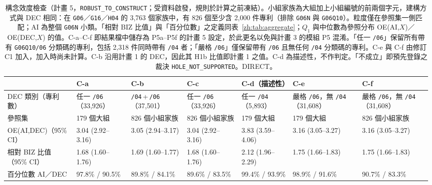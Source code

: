 \begin{table}[tbp]
  \centering
  \caption{構念效度檢查（計畫 5，\texttt{ROBUST\_\allowbreak TO\_\allowbreak CONSTRUCT}；受資料啟發，規則於計算之前凍結）。小組家族為大組加上小組編號的前兩個字元，建構方式與 DEC 相同：在 \texttt{G06}／\texttt{G16}／\texttt{H04} 的 3,763 個家族中，有 826 個至少含 2,000 件專利（排除 \texttt{G06N} 與 \texttt{G06Q10}）。粒度僅在參照集一側匹配；AI 為整個 \texttt{G06N} 小類。「相對 BIZ 比值」與「百分位數」之定義同表~\ref{zh:tab:aggregate}；$Q_1$ 與中位數為參照分布 OE(AI,$X$)／OE(DEC,$X$) 的值。C-a--C-f 即結果檔中儲存為 P5a--P5f 的計畫 5 設定，於此更名以免與計畫 3 的模組 P5 混淆。「任一 \texttt{/06}」保留所有帶有 \texttt{G06Q10/06} 分類碼的專利，包括 2,318 件同時帶有 \texttt{/04} 者；「嚴格 \texttt{/06}」僅保留帶有 \texttt{/06} 且無任何 \texttt{/04} 分類碼的專利。C-e 與 C-f 由修訂 C1 加入，加入時尚未計算。C-b 沿用計畫 1 的 DEC，因此其 H1b 比值即計畫 1 之值。C-d 為描述性，不作判定。「不成立」即預先登錄之裁決 \texttt{HOLE\_\allowbreak NOT\_\allowbreak SUPPORTED}。DIRECT。}
  \label{zh:tab:construct}
  \scriptsize
  \setlength{\tabcolsep}{3pt}
  \begin{tabular}{@{}p{2.1cm}p{2.0cm}p{2.0cm}p{2.0cm}p{2.0cm}p{2.0cm}p{2.0cm}@{}}
    \toprule
    & C-a & C-b & C-c & C-d（描述性） & C-e & C-f \tabularnewline
    \midrule
    \raggedright DEC 類別（專利數） & \raggedright 任一 \texttt{/06}（33,926） & \raggedright \texttt{/04}\,+\,\texttt{/06}（37,501） & \raggedright 任一 \texttt{/06}（33,926） & \raggedright 任一 \texttt{/04}（5,893） & \raggedright 嚴格 \texttt{/06}，無 \texttt{/04}（31,608） & \raggedright 嚴格 \texttt{/06}，無 \texttt{/04}（31,608） \tabularnewline
    \raggedright 參照集 & \raggedright 179 個大組 & \raggedright 826 個小組家族 & \raggedright 826 個小組家族 & \raggedright 179 個大組 & \raggedright 179 個大組 & \raggedright 826 個小組家族 \tabularnewline
    \raggedright OE(AI,DEC)（95\% CI） & \raggedright 3.04 (2.92--3.16) & \raggedright 3.05 (2.94--3.17) & \raggedright 3.04 (2.92--3.16) & \raggedright 3.83 (3.59--4.06) & \raggedright 3.16 (3.05--3.27) & \raggedright 3.16 (3.05--3.27) \tabularnewline
    \raggedright 相對 BIZ 比值（95\% CI） & \raggedright 1.68 (1.60--1.76) & \raggedright 1.69 (1.60--1.77) & \raggedright 1.68 (1.60--1.76) & \raggedright 2.12 (1.96--2.29) & \raggedright 1.75 (1.66--1.83) & \raggedright 1.75 (1.66--1.83) \tabularnewline
    \raggedright 百分位數 AI／DEC & \raggedright 97.8\% / 90.5\% & \raggedright 89.8\% / 84.1\% & \raggedright 89.6\% / 83.5\% & \raggedright 99.4\% / 93.9\% & \raggedright 98.9\% / 91.6\% & \raggedright 90.7\% / 83.3\% \tabularnewline

\end{tabular}
\end{table}
